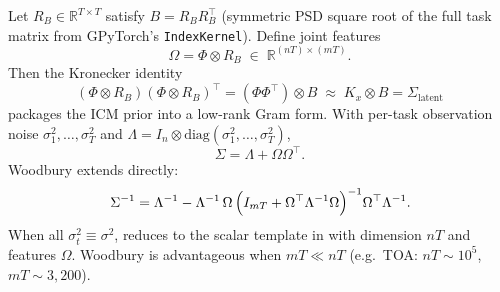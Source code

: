 \documentclass[11pt]{article}
\newcommand{\noise}{\sigma^2}
\newcommand{\Sig}{\Sigma}
\newcommand{\Ph}{\Phi}
\newcommand{\Om}{\Omega}
\newcommand{\RB}{R_B}
\begin{document}
Let $\RB \in \mathbb{R}^{T \times T}$ satisfy $B = \RB\RB^\top$ (symmetric PSD square root of the
full task matrix from GPyTorch's \texttt{IndexKernel}).
Define joint features
\begin{equation}
  \label{eq:omega}
  \Om = \Ph \otimes \RB
  \;\in\; \mathbb{R}^{(nT) \times (mT)}.
\end{equation}
Then the Kronecker identity
\begin{equation}
  \label{eq:omega-identity}
  (\Ph \otimes \RB)(\Ph \otimes \RB)^\top
  = (\Ph\Ph^\top) \otimes B
  \;\approx\; K_x \otimes B
  = \Sig_{\mathrm{latent}}
\end{equation}
packages the ICM prior into a low-rank Gram form.
With per-task observation noise $\noise_1,\ldots,\noise_T$ and
$\Lambda = I_n \otimes \mathrm{diag}(\noise_1,\ldots,\noise_T)$,
\begin{equation}
  \label{eq:sigma-mt}
  \Sig = \Lambda + \Om\Om^\top.
\end{equation}
Woodbury extends directly:
\begin{equation}
  \label{eq:woodbury-mt}
  \Sig^{-1}
  = \Lambda^{-1}
  - \Lambda^{-1}\,\Om\,
    \Bigl(I_{mT} + \Om^\top \Lambda^{-1} \Om\Bigr)^{-1}
    \Om^\top \Lambda^{-1}.
\end{equation}
When all $\noise_t \equiv \noise$,  reduces to the scalar template in
 with dimension $nT$ and features $\Om$.
Woodbury is advantageous when $mT \ll nT$ (e.g.\ TOA: $nT \sim 10^5$, $mT \sim 3{,}200$).



\end{document}
